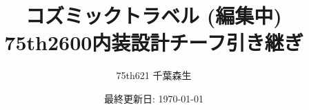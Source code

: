 \usepackage{docmute}



\usepackage{graphicx}

\usepackage{xcolor}
\graphicspath{{./docs/images/}{./images/}}
\color{forground}
\pagecolor{background}

\usepackage{siunitx}

\usepackage{tikz}
\usetikzlibrary{intersections,calc,arrows.meta}

\usepackage[subrefformat=parens]{subcaption}

\usepackage{prettyref}
\newcommand*{\fullref}[1]{\hyperref[#1]{\prettyref{#1}}}

\usepackage[pdfusetitle,hidelinks]{hyperref}
\usepackage{pxjahyper}

\newcommand*{\includefig}[5][c]{%
    \begin{minipage}[#1]{#2\linewidth}
        \centering
        \texttt{[image: \#5]}
        \subcaption{#3}
        \label{#4}
    \end{minipage}
}
\newenvironment{imageHere}[2][htbp]{\def\@imageHereTmp{#2}%
    \begin{figure}[#1]
        \centering
}{%
        \caption{\@imageHereTmp}
        \label{figs:\@imageHereTmp}
    \end{figure}
}

\title{
    コズミックトラベル (編集中) \\
    \large 75th2600内装設計チーフ引き継ぎ
}
\author{75th621 千葉森生}
\date{最終更新日: \today}